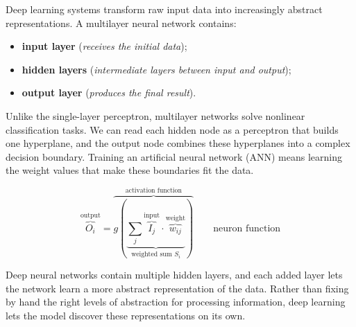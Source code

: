 Deep learning systems transform raw input data into increasingly abstract representations. A multilayer neural network contains:
\begin{itemize}
    \item \textbf{input layer} (\textit{receives the initial data});
    \item \textbf{hidden layers} (\textit{intermediate layers between input and output});
    \item \textbf{output layer} (\textit{produces the final result}).
\end{itemize}


Unlike the single-layer perceptron, multilayer networks solve nonlinear classification tasks. We can read each hidden node as a perceptron that builds one hyperplane, and the output node combines these hyperplanes into a complex decision boundary. Training an artificial neural network (ANN) means learning the weight values that make these boundaries fit the data.

\begin{equation}
\overbrace{O_i}^{\text{output}}  = \overbrace{g\left(\underbrace{\sum_j \overbrace{I_j}^{\text{input}} \cdot \overbrace{w_{ij}}^{\text{weight}}}_{\text{weighted sum } S_i}\right)}^\text{activation function}\qquad\text{neuron function}\label{neuron-func}
\end{equation}

Deep neural networks contain multiple hidden layers, and each added layer lets the network learn a more abstract representation of the data. Rather than fixing by hand the right levels of abstraction for processing information, deep learning lets the model discover these representations on its own.

